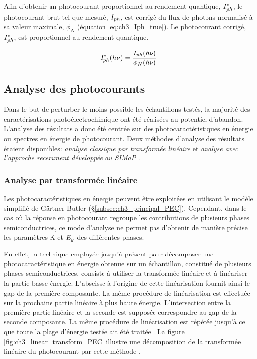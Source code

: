 \begin{refsection}
    Afin d'obtenir un photocourant proportionnel au rendement quantique, $I_{ph}^{\ast}$, le photocourant brut tel que mesuré,
    $I_{ph}$, est corrigé du flux de photons normalisé à sa valeur maximale, $\phi _N$ (équation
    \ref{eq:ch3_Iph_true}). Le photocourant corrigé, $I_{ph}^{\ast}$, est proportionnel au rendement quantique.

    \begin{equation}
        I_{ph}^{\ast} (h\nu) = \frac{I_{ph} (h\nu)}{\phi _N (h\nu)}
        \label{eq:ch3_Iph_true}
    \end{equation}
    

    \subsection{Analyse des photocourants}\label{subsec:ch3_interpretation_PEC}

    Dans le but de perturber le moins possible les échantillons testés, la majorité des caractérisations
    photoélectrochimique ont été réalisées au potentiel d'abandon. L'analyse des résultats
    a donc été centrée sur des photocaractéristiques en énergie ou spectres en énergie de photocourant. 
    Deux méthodes d'analyse des résultats étaient disponibles:
    \emph{analyse classique par transformée linéaire} et \emph{analyse avec l'approche recemment développée au SIMaP}
    \citep{Petit2013}.

    \subsubsection{Analyse par transformée linéaire}\label{subsubsec:ch3_linear_transform}
    
    Les photocaractéristiques en énergie peuvent être exploitées en utilisant le modèle simplifié de Gärtner-Butler
    (\S\ref{subsec:ch3_principal_PEC}). Cependant, dans le cas où la réponse en photocourant regroupe les contributions
    de plusieurs phases semiconductrices, ce mode d'analyse ne permet pas d'obtenir de manière précise les paramètres K
    et $E_g$ des différentes phases.
    
    En effet, la technique employée jusqu'à présent pour décomposer une photocaractéristique en énergie obtenue sur un échantillon,
    constitué de plusieurs phases semiconductrices, consiste à utiliser la transformée linéaire et à linéariser
    la partie basse énergie. L'abscisse à l'origine de cette linéarisation fournit ainsi le gap de la première
    composante.
    La même procédure de linéarisation est effectuée sur la prochaine partie linéaire à plus haute
    énergie. L'intersection entre la première partie linéaire et la seconde est supposée correspondre au gap de la seconde composante.
    La même procédure de linéarisation est répétée jusqu'à ce que toute la plage d'énergie testée ait été traitée
    \citep{Petit2013}. La figure \ref{fig:ch3_linear_transform_PEC} illustre une décomposition de la transformée linéaire
    du photocourant par cette méthode \citep{Petit2013}.


\end{refsection}
